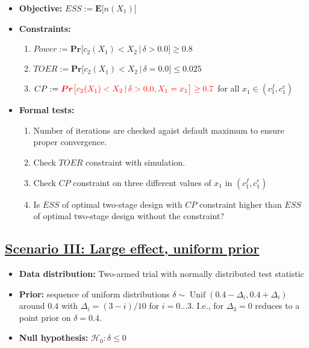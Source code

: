 \documentclass[]{book}
\providecommand{\tightlist}{%
  \setlength{\itemsep}{0pt}\setlength{\parskip}{0pt}}
\begin{document}
\begin{itemize}
\tightlist
\item
  \textbf{Objective:} \(ESS := \boldsymbol{E}\big[n(X_1)\big]\)
\item
  \textbf{Constraints:}

  \begin{enumerate}
  \def\labelenumi{\arabic{enumi}.}
  \tightlist
  \item
    \(Power := \boldsymbol{Pr}\big[c_2(X_1) < X_2\,|\,\delta>0.0\big] \geq 0.8\)
  \item
    \(TOER := \boldsymbol{Pr}\big[c_2(X_1) < X_2\,|\,\delta=0.0\big] \leq 0.025\)
  \item
    \(CP := \color{red}{\boldsymbol{Pr}\big[c_2(X_1) < X_2\,|\,\delta> 0.0, X_1 = x_1\big] \geq 0.7}\)
    for all \(x_1\in(c_1^f, c_1^e)\)
  \end{enumerate}
\item
  \textbf{Formal tests:}

  \begin{enumerate}
  \def\labelenumi{\arabic{enumi}.}
  \tightlist
  \item
    Number of iterations are checked agaist default maximum to ensure proper
    convergence.
  \item
    Check \(TOER\) constraint with simulation.
  \item
    Check \(CP\) constraint on three different values of \(x_1\) in
    \((c_1^f, c_1^e)\)
  \item
    Is \(ESS\) of optimal two-stage design with \(CP\) constraint higher than
    \(ESS\) of optimal two-stage design without the constraint?
  \end{enumerate}
\end{itemize}

\hypertarget{scenario-iii-large-effect-uniform-prior}{%
\subsection{\texorpdfstring{\protect\hyperlink{scenarioIII}{Scenario III: Large effect, uniform prior}}{Scenario III: Large effect, uniform prior}}\label{scenario-iii-large-effect-uniform-prior}}

\begin{itemize}
\tightlist
\item
  \textbf{Data distribution:} Two-armed trial with normally distributed test statistic
\item
  \textbf{Prior:} sequence of uniform distributions
  \(\delta\sim\operatorname{Unif}(0.4 - \Delta_i, 0.4 + \Delta_i)\)
  around \(0.4\) with \(\Delta_i=(3 - i)/10\) for \(i=0\ldots 3\).
  I.e., for \(\Delta_3=0\) reduces to a point prior on \(\delta=0.4\).
\item
  \textbf{Null hypothesis:} \(\mathcal{H}_0:\delta \leq 0\)
\end{itemize}
\end{document}
